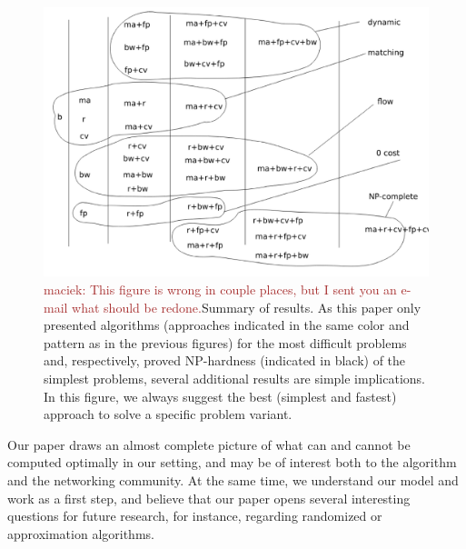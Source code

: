 \documentclass[9pt]{sigcomm-alternate}
\newcommand{\maciek}[1]{\textcolor{brown}{maciek: #1}}
\begin{document}
\begin{figure}
\includegraphics[width=\columnwidth]{figs/summary}
\caption{\maciek{This figure is wrong in couple places, but I sent you an e-mail what should be redone.}Summary of results. As this paper only presented algorithms (approaches indicated in the same
color and pattern as in the previous figures) for the most
difficult problems and, respectively, proved NP-hardness (indicated in black) of the simplest
problems, several additional results are simple implications. In this figure,
we always suggest the best (simplest and fastest) approach to solve a specific problem variant.}
\label{fig:summary}
\end{figure}




Our paper draws an almost complete picture of what can and cannot be
computed optimally in our setting, and may be of interest both to the algorithm
and the networking community. At the same time, we understand our model and work
as a first step, and believe that our paper opens several interesting
questions for future research, for instance, regarding randomized 
or approximation algorithms.


%



\begin{appendix}


\end{appendix}
\end{document}
